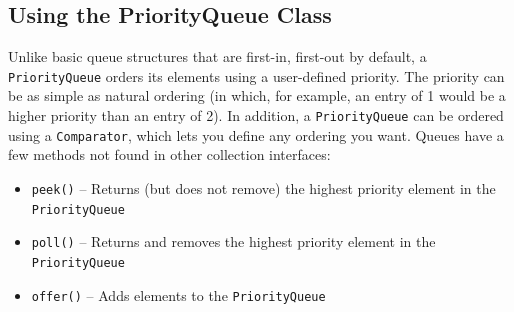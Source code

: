 \subsection{Using the PriorityQueue Class}
Unlike basic queue structures that are first-in, first-out by default, a 
\verb#PriorityQueue# orders its elements using a user-defined priority. The 
priority can be as simple as natural ordering (in which, for example, an entry 
of 1 would be a higher priority than an entry of 2). In addition, a 
\verb#PriorityQueue# can be ordered using a \verb#Comparator#, which lets you 
define any ordering you want. Queues have a few methods not found in other 
collection interfaces:
\begin{itemize}
    \item \verb#peek()# -- Returns (but does not remove) the highest priority 
    element in the \verb#PriorityQueue#
    \item \verb#poll()# -- Returns and removes the highest priority element in 
    the \verb#PriorityQueue#
    \item \verb#offer()# -- Adds elements to the \verb#PriorityQueue#
\end{itemize}

